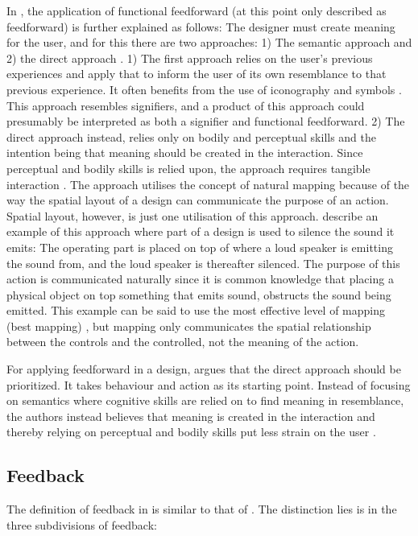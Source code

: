 In , the application of functional feedforward (at this point only described as feedforward) is further explained as follows: The designer must create meaning for the user, and for this there are two approaches: 1) The semantic approach and 2) the direct approach \cite{howdonald}. 1) The first approach relies on the user's previous experiences and apply that to inform the user of its own resemblance to that previous experience. It often benefits from the use of iconography and symbols \cite{howdonald}. This approach resembles signifiers, and a product of this approach could presumably be interpreted as both a signifier and functional feedforward. 2) The direct approach instead, relies only on bodily and perceptual skills and the intention being that meaning should be created in the interaction. Since perceptual and bodily skills is relied upon, the approach requires tangible interaction \cite{howdonald}. The approach utilises the concept of natural mapping because of the way the spatial layout of a design can communicate the purpose of an action. Spatial layout, however, is just one utilisation of this approach.  describe an example of this approach where part of a design is used to silence the sound it emits: The operating part is placed on top of where a loud speaker is emitting the sound from, and the loud speaker is thereafter silenced. The purpose of this action is communicated naturally since it is common knowledge that placing a physical object on top something that emits sound, obstructs the sound being emitted. This example can be said to use the most effective level of mapping (best mapping) \cite{norman}, but mapping only communicates the spatial relationship between the controls and the controlled, not the meaning of the action.

For applying feedforward in a design,  argues that the direct approach should be prioritized. It takes behaviour and action as its starting point. Instead of focusing on semantics where cognitive skills are relied on to find meaning in resemblance, the authors instead believes that meaning is created in the interaction and thereby relying on perceptual and bodily skills put less strain on the user \cite{frogger}.

\subsection{Feedback} The definition of feedback in  is similar to that of . The distinction lies is in the three subdivisions of feedback:
